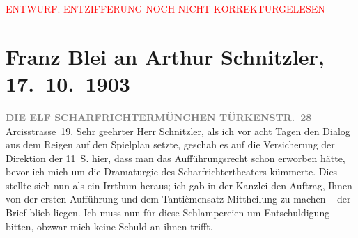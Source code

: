 
\begin{center}
            \textcolor{red}{ENTWURF. ENTZIFFERUNG NOCH NICHT KORREKTURGELESEN}
                      \end{center}
            
               \section[Franz Blei an Arthur Schnitzler, 17. 10. 1903]{ Franz Blei an Arthur Schnitzler, 17. 10. 1903}\nopagebreak{}\rehead{ }\begin{ledgroupsized}[t]{13cm}\normalsize\beginnumbering{} \toendnotes[C]{\smallbreak\pagebreak[2]} 
\toendnotes[C]{\smallbreak}\pstart
           \noindent{}\centering{}{\pb}\textcolor{gray}{\textbf{DIE ELF SCHARFRICHTERMÜNCHEN TÜRKENSTR. 28}}\pend
           \pstart
           \noindent{}\raggedleft{}Arcisstrasse 19. \pend
           \pstart{}Sehr geehrter Herr Schnitzler,\pend\pstart
           als ich vor acht Tagen den Dialog aus dem Reigen
               auf den Spielplan setzte, geschah es auf die Versicherung der Direktion der 11 S. hier, dass man das Aufführungsrecht schon
               erworben hätte, bevor ich mich um die Dramaturgie des Scharfrichtertheaters kümmerte. Dies stellte sich nun als ein Irrthum
               heraus; ich gab in der Kanzlei den Auftrag, Ihnen von der ersten Aufführung und dem
               Tantièmensatz Mittheilung zu machen – der Brief blieb liegen. Ich muss nun für diese
               Schlampereien um Entschuldigung bitten, obzwar mich keine Schuld an ihnen trifft.

\end{ledgroupsized}
